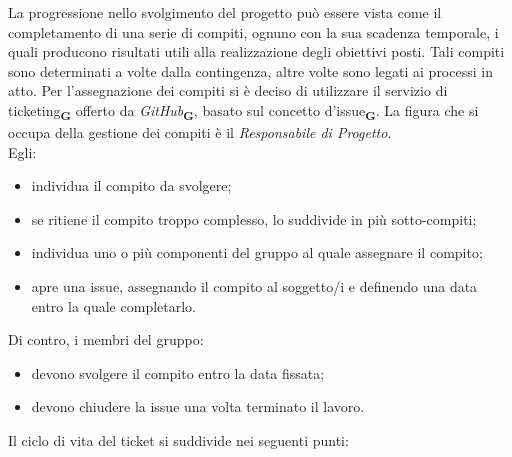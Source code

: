 La progressione nello svolgimento del progetto può essere vista come il completamento di una serie di compiti, ognuno con la sua scadenza temporale, i quali producono risultati utili alla realizzazione degli obiettivi posti. Tali compiti sono determinati a volte dalla contingenza, altre volte sono legati ai processi in atto. Per l’assegnazione dei compiti si è deciso di utilizzare il servizio di ticketing\textsubscript{\textbf{G}} offerto da \textit{GitHub}\textsubscript{\textbf{G}}, basato sul concetto d'issue\textsubscript{\textbf{G}}. La figura che si occupa della gestione dei compiti è il \textit{Responsabile di Progetto}.\\
Egli:
\begin{itemize}
    \item individua il compito da svolgere;
    \item se ritiene il compito troppo complesso, lo suddivide in più sotto-compiti;
    \item individua uno o più componenti del gruppo al quale assegnare il compito;
    \item apre una issue, assegnando il compito al soggetto/i e definendo una data entro la quale completarlo.

\end{itemize}
Di contro, i membri del gruppo:
\begin{itemize}
    \item devono svolgere il compito entro la data fissata;
    \item devono chiudere la issue una volta terminato il lavoro.
\end{itemize}
Il ciclo di vita del ticket si suddivide nei seguenti punti:
